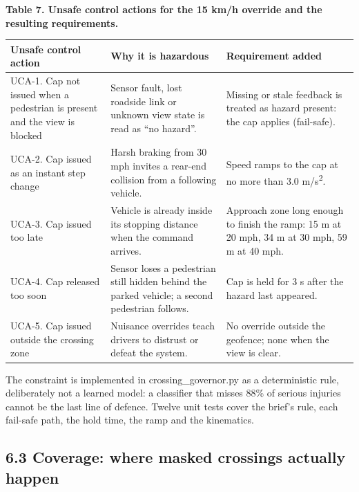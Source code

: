 \documentclass[10pt,a4paper]{article}
\begin{document}
\begin{center}\begin{minipage}{\textwidth}{\small\bfseries Table 7. Unsafe control actions for the 15 km/h override and the resulting requirements.}\\[3pt]\small\setlength{\tabcolsep}{3pt}\begin{tabular}{@{}>{\raggedright\arraybackslash}p{}>{\raggedright\arraybackslash}p{}>{\raggedright\arraybackslash}p{}@{}}\toprule \textbf{Unsafe control action} & \textbf{Why it is hazardous} & \textbf{Requirement added} \\ \midrule 
UCA-1. Cap not issued when a pedestrian is present and the view is blocked & Sensor fault, lost roadside link or unknown view state is read as ``no hazard''. & Missing or stale feedback is treated as hazard present: the cap applies (fail-safe). \\
UCA-2. Cap issued as an instant step change & Harsh braking from 30 mph invites a rear-end collision from a following vehicle. & Speed ramps to the cap at no more than 3.0 m/s\textsuperscript{2}. \\
UCA-3. Cap issued too late & Vehicle is already inside its stopping distance when the command arrives. & Approach zone long enough to finish the ramp: 15 m at 20 mph, 34 m at 30 mph, 59 m at 40 mph. \\
UCA-4. Cap released too soon & Sensor loses a pedestrian still hidden behind the parked vehicle; a second pedestrian follows. & Cap is held for 3 s after the hazard last appeared. \\
UCA-5. Cap issued outside the crossing zone & Nuisance overrides teach drivers to distrust or defeat the system. & No override outside the geofence; none when the view is clear. \\ \bottomrule\end{tabular}\end{minipage}\end{center}

The constraint is implemented in crossing\_governor.py as a deterministic rule, deliberately not a learned model: a classifier that misses 88\% of serious injuries cannot be the last line of defence. Twelve unit tests cover the brief's rule, each fail-safe path, the hold time, the ramp and the kinematics.\par

\subsection*{6.3 Coverage: where masked crossings actually happen}
\end{document}
